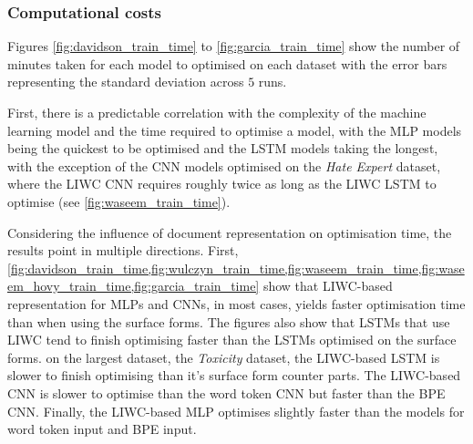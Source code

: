 \subsubsection{Computational costs}

Figures \ref{fig:davidson_train_time} to \ref{fig:garcia_train_time} show the number of minutes taken for each model to optimised on each dataset with the error bars representing the standard deviation across $5$ runs.

First, there is a predictable correlation with the complexity of the machine learning model and the time required to optimise a model, with the MLP models being the quickest to be optimised and the LSTM models taking the longest, with the exception of the CNN models optimised on the \textit{Hate Expert} dataset, where the LIWC CNN requires roughly twice as long as the LIWC LSTM to optimise (see \cref{fig:waseem_train_time}).

Considering the influence of document representation on optimisation time, the results point in multiple directions.
First, \cref{fig:davidson_train_time,fig:wulczyn_train_time,fig:waseem_train_time,fig:waseem_hovy_train_time,fig:garcia_train_time} show that LIWC-based representation for MLPs and CNNs, in most cases, yields faster optimisation time than when using the surface forms.
The figures also show that LSTMs that use LIWC tend to finish optimising faster than the LSTMs optimised on the surface forms.
 on the largest dataset, the \textit{Toxicity} dataset, the LIWC-based LSTM is slower to finish optimising than it's surface form counter parts.
The LIWC-based CNN is slower to optimise than the word token CNN but faster than the BPE CNN.
Finally, the LIWC-based MLP optimises slightly faster than the models for word token input and BPE input.

